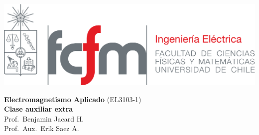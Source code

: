 \documentclass[
  11pt,
  letterpaper,
   addpoints,
   answers
  ]{exam}
\begin{document}
\noindent
\begin{minipage}{0.47\textwidth}
\includegraphics[width=\textwidth]{../fcfm_die}
\end{minipage}
\begin{minipage}{0.53\textwidth}
\begin{center} 
\large\textbf{Electromagnetismo Aplicado} (EL3103-1) \\
\large\textbf{Clase auxiliar extra} \\
\normalsize Prof.~Benjamin Jacard H.\\
\normalsize Prof.~Aux.~Erik Saez A.
\end{center}
\end{minipage}
\end{document}
